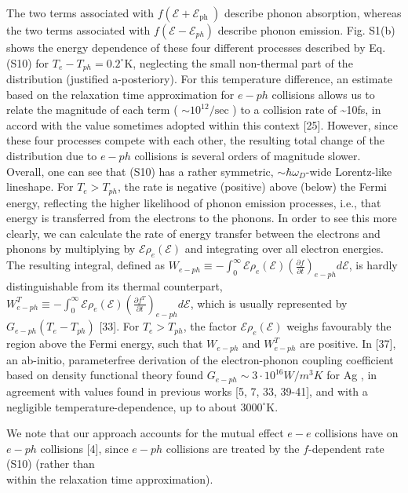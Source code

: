 \documentclass[10pt]{article}
\begin{document}
The two terms associated with $f\left(\mathcal{E}+\mathcal{E}_{\text {ph }}\right)$ describe phonon absorption, whereas the two terms associated with $f\left(\mathcal{E}-\mathcal{E}_{p h}\right)$ describe phonon emission. Fig. S1(b) shows the energy dependence of these four different processes described by Eq. (S10) for $T_{e}-T_{p h}=0.2^{\circ} \mathrm{K}$, neglecting the small non-thermal part of the distribution (justified a-posteriory). For this temperature difference, an estimate based on the relaxation time approximation for $e-p h$ collisions allows us to relate the magnitude of each term ( $\sim 10^{12} / \mathrm{sec}$ ) to a collision rate of \~{}10fs, in accord with the value sometimes adopted within this context [25]. However, since these four processes compete with each other, the resulting total change of the distribution due to $e-p h$ collisions is several orders of magnitude slower. Overall, one can see that (S10) has a rather symmetric, $\sim \hbar \omega_{D}$-wide Lorentz-like lineshape. For $T_{e}>T_{p h}$, the rate is negative (positive) above (below) the Fermi energy, reflecting the higher likelihood of phonon emission processes, i.e., that energy is transferred from the electrons to the phonons. In order to see this more clearly, we can calculate the rate of energy transfer between the electrons and phonons by multiplying by $\mathcal{E} \rho_{e}(\mathcal{E})$ and integrating over all electron energies. The resulting integral, defined as $W_{e-p h} \equiv-\int_{0}^{\infty} \mathcal{E} \rho_{e}(\mathcal{E})\left(\frac{\partial f}{\partial t}\right)_{e-p h} d \mathcal{E}$, is hardly distinguishable from its thermal counterpart, $W_{e-p h}^{T} \equiv-\int_{0}^{\infty} \mathcal{E} \rho_{e}(\mathcal{E})\left(\frac{\partial f^{T}}{\partial t}\right)_{e-p h} d \mathcal{E}$, which is usually represented by $G_{e-p h}\left(T_{e}-T_{p h}\right)$ [33]. For $T_{e}>T_{p h}$, the factor $\mathcal{E} \rho_{e}(\mathcal{E})$ weighs favourably the region above the Fermi energy, such that $W_{e-p h}$ and $W_{e-p h}^{T}$ are positive. In [37], an ab-initio, parameterfree derivation of the electron-phonon coupling coefficient based on density functional theory found $G_{e-p h} \sim 3 \cdot 10^{16} W / m^{3} K$ for Ag , in agreement with values found in previous works [5, 7, 33, 39-41], and with a negligible temperature-dependence, up to about $3000^{\circ} \mathrm{K}$.

We note that our approach accounts for the mutual effect $e-e$ collisions have on $e-p h$ collisions [4], since $e-p h$ collisions are treated by the $f$-dependent rate (S10) (rather than\\
within the relaxation time approximation).
\end{document}
